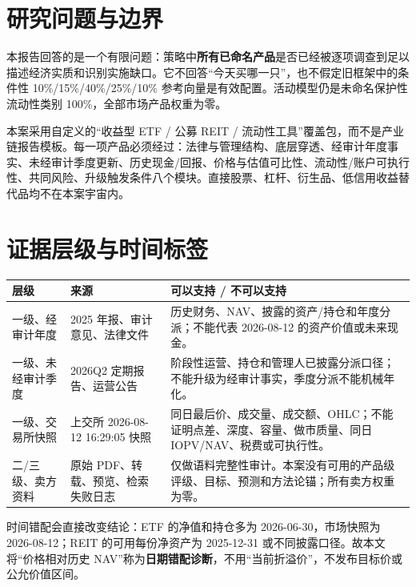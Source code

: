 \section{研究问题与边界}

本报告回答的是一个有限问题：策略中\textbf{所有已命名产品}是否已经被逐项调查到足以描述经济实质和识别实施缺口。它不回答“今天买哪一只”，也不假定旧框架中的条件性 10\%/15\%/40\%/25\%/10\% 参考向量是有效配置。活动模型仍是未命名保护性流动性类别 100\%，全部市场产品权重为零。

本案采用自定义的“收益型 ETF / 公募 REIT / 流动性工具”覆盖包，而不是产业链报告模板。每一项产品必须经过：法律与管理结构、底层穿透、经审计年度事实、未经审计季度更新、历史现金/回报、价格与估值可比性、流动性/账户可执行性、共同风险、升级触发条件八个模块。直接股票、杠杆、衍生品、低信用收益替代品均不在本案宇宙内。

\section{证据层级与时间标签}

\begin{exhibitbox}[表 2：本案证据层级]
\small
\begin{tabularx}{\exhibitboxwidth}{L{2.0cm}L{3.1cm}X}
\toprule
\textbf{层级} & \textbf{来源} & \textbf{可以支持 / 不可以支持} \\
\midrule
一级、经审计年度 & 2025 年报、审计意见、法律文件 & 历史财务、NAV、披露的资产/持仓和年度分派；不能代表 2026-08-12 的资产价值或未来现金。\\
一级、未经审计季度 & 2026Q2 定期报告、运营公告 & 阶段性运营、持仓和管理人已披露分派口径；不能升级为经审计事实，季度分派不能机械年化。\\
一级、交易所快照 & 上交所 2026-08-12 16:29:05 快照 & 同日最后价、成交量、成交额、OHLC；不能证明点差、深度、容量、做市质量、同日 IOPV/NAV、税费或可执行性。\\
二/三级、卖方资料 & 原始 PDF、转载、预览、检索失败日志 & 仅做语料完整性审计。本案没有可用的产品级评级、目标、预测和方法论锚；所有卖方权重为零。\\
\bottomrule
\end{tabularx}
\end{exhibitbox}

时间错配会直接改变结论：ETF 的净值和持仓多为 2026-06-30，市场快照为 2026-08-12；REIT 的可用每份净资产为 2025-12-31 或不同披露口径。故本文将“价格相对历史 NAV”称为\textbf{日期错配诊断}，不用“当前折溢价”，不发布目标价或公允价值区间。

